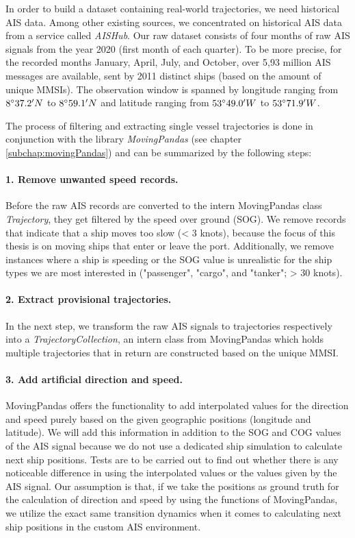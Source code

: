 In order to build a dataset containing real-world trajectories, we need historical AIS data. 
Among other existing sources, we concentrated on historical AIS data from a service called \textit{AISHub}. Our raw dataset consists of four months of raw AIS signals from the year 2020 (first month of each quarter). To be more precise, for the recorded months January, April, July, and  October, over 5,93 million AIS messages are available, sent by 2011 distinct ships (based on the amount of unique MMSIs). The observation window is spanned by longitude ranging from $8\degree37.2'N$ to $8\degree59.1'N$ and latitude ranging from $53\degree49.0'W$ to $53\degree71.9'W$.
\par
The process of filtering and extracting single vessel trajectories is done  in  conjunction  with  the  library \textit{MovingPandas} (see chapter \ref{subchap:movingPandas}) and can be summarized by the following steps:
\paragraph{1. Remove unwanted speed records.}
Before the raw AIS records are converted to the intern MovingPandas class \textit{Trajectory}, they get filtered by the speed over ground (SOG). We remove records that indicate that a ship moves too slow (< 3 knots), because the focus of this thesis is on moving ships that enter or leave the port. Additionally, we remove instances where a ship is speeding or the SOG value is unrealistic for the ship types we are most interested in ("passenger", "cargo", and "tanker"; > 30 knots).


\paragraph{2. Extract provisional trajectories.}
In the next step, we transform the raw AIS signals to trajectories respectively into a \textit{TrajectoryCollection}, an intern class from MovingPandas which holds multiple trajectories that in return are constructed based on the unique MMSI. 

\paragraph{3. Add artificial direction and speed.}
MovingPandas offers the functionality to add interpolated values for the direction and speed purely based on the given geographic positions (longitude and latitude). We will add this information in addition to the SOG and COG values of the AIS signal because we do not use a dedicated ship simulation to calculate next ship positions. Tests are to be carried out to find out whether there is any noticeable difference in using the interpolated values or the values given by the AIS signal. Our assumption is that, if we take the positions as ground truth for the calculation of direction and speed by using the functions of MovingPandas, we utilize the exact same transition dynamics when it comes to calculating next ship positions in the custom AIS environment.

